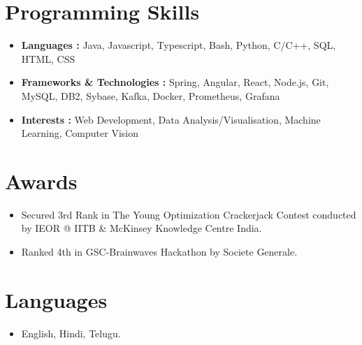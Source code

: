 \documentclass[letterpaper,11pt]{article}
\newcommand{\resumeSubHeadingListStart}{\begin{itemize}[leftmargin=*]}
\newcommand{\resumeSubHeadingListEnd}{\end{itemize}}
\begin{document}
\section{Programming Skills}
  \resumeSubHeadingListStart
    \item{
      \textbf{Languages : }{Java, Javascript, Typescript, Bash, Python, C/C++, SQL, HTML, CSS}
    }
    \item{
      \textbf{Frameworks \& Technologies : }{Spring, Angular, React, Node.js, Git, MySQL, DB2, Sybase, Kafka, Docker, Prometheus, Grafana}
    }
    \item{
      \textbf{Interests : }{Web Development, Data Analysis/Visualisation, Machine Learning, Computer Vision}
    }
  \resumeSubHeadingListEnd
  
\section{Awards}
  \resumeSubHeadingListStart
    \item{
      {Secured 3rd Rank in The Young Optimization Crackerjack Contest conducted by IEOR @ IITB \& McKinsey Knowledge Centre India.}
    }
    \item{
      {Ranked 4th in GSC-Brainwaves Hackathon by Societe Generale.}
    }
  \resumeSubHeadingListEnd

\section{Languages}
  \resumeSubHeadingListStart
    \item{
      {English, Hindi, Telugu.}
    }
  \resumeSubHeadingListEnd

\end{document}
